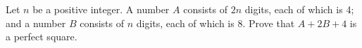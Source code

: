 Let $n$ be a positive integer. A number $A$ consists of $2n$ digits, each of which is 4; and a number $B$ consists of $n$ digits, each of which is 8. Prove that $A+2B+4$ is a perfect square.